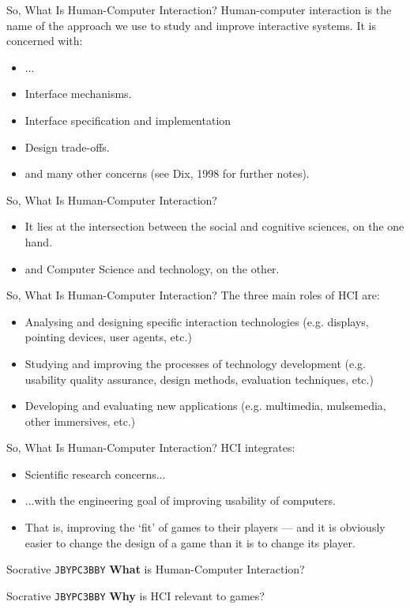 \begin{frame}{So, What Is Human-Computer Interaction?}
	Human-computer interaction is the name of the approach we use to study and improve interactive systems. It is concerned with:
	\begin{itemize}
		\item ...
		\item Interface mechanisms.
		\item Interface specification and implementation
		\item Design trade-offs.
		\item and many other concerns (see Dix, 1998 for further notes).
	\end{itemize}
\end{frame}

\begin{frame}{So, What Is Human-Computer Interaction?}
	\begin{itemize}
		\item It lies at the intersection between the social and cognitive sciences, on the one hand.
		\item and Computer Science and technology, on the other.
	\end{itemize}
\end{frame}

\begin{frame}{So, What Is Human-Computer Interaction?}
	The three main roles of HCI are:
	\begin{itemize}
		\item Analysing and designing specific interaction technologies (e.g. displays, pointing devices, user agents, etc.)
		\item Studying and improving the processes of technology development (e.g. usability quality assurance, design methods, evaluation techniques, etc.)
		\item Developing and evaluating new applications (e.g. multimedia, mulsemedia, other immersives, etc.)
	\end{itemize}
\end{frame}

\begin{frame}{So, What Is Human-Computer Interaction?}
	HCI integrates:
	\begin{itemize}
		\item Scientific research concerns... \pause
		\item ...with the engineering goal of improving usability of computers. \pause
		\item That is, improving the `fit' of games to their players --- and it is obviously easier to change the design of a game than it is to change its player.
	\end{itemize}
\end{frame}




\begin{frame}[fragile]{Socrative \texttt{JBYPC3BBY}}
    \textbf{What} is Human-Computer Interaction?
\end{frame}

\begin{frame}[fragile]{Socrative \texttt{JBYPC3BBY}}
    \textbf{Why} is HCI relevant to games?
\end{frame}